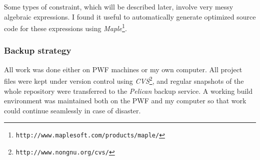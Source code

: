 Some types of constraint, which will be described later, involve very messy algebraic expressions.
I found it useful to automatically generate optimized source code for these expressions
using \textsl{Maple}\footnote{\texttt{http://www.maplesoft.com/products/maple/}}.

\subsubsection{Backup strategy}
All work was done either on PWF machines or my own computer. All project files were kept under
version control using \textsl{CVS}\footnote{\texttt{http://www.nongnu.org/cvs/}}, and regular
snapshots of the whole repository were transferred to the \textsl{Pelican} backup service.
A working build environment was maintained both on the PWF and my computer so that work could
continue seamlessly in case of disaster.

